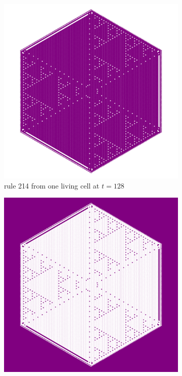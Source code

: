 \documentclass{article}
\begin{document}
\begin{figure}[H]
     \centering
     \begin{subfigure}[b]{0.48\textwidth}
         \centering
         \includegraphics[width=\textwidth]{graphics/behavior/twins/rule-214-OneAlive.pdf}
         \caption{rule 214 from one living cell at $t=128$}
         \label{fig:twin-1}
     \end{subfigure}
     \hspace{0.02\textwidth}
     \begin{subfigure}[b]{0.48\textwidth}
         \centering
         \includegraphics[width=\textwidth]{graphics/behavior/twins/rule-148-OneDead.pdf}

\end{subfigure}
\end{figure}
\end{document}
